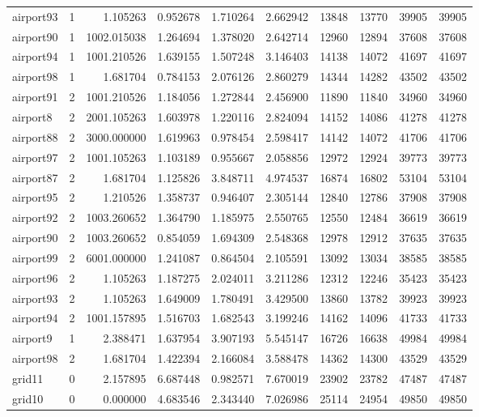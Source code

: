 \begin{longtable}{|l|r|r|r|r|r|r|r|r|r|}
airport93 & 1 & 1.105263 & 0.952678 & 1.710264 & 2.662942 & 13848 & 13770 & 39905 & 39905 \\
airport90 & 1 & 1002.015038 & 1.264694 & 1.378020 & 2.642714 & 12960 & 12894 & 37608 & 37608 \\
airport94 & 1 & 1001.210526 & 1.639155 & 1.507248 & 3.146403 & 14138 & 14072 & 41697 & 41697 \\
airport98 & 1 & 1.681704 & 0.784153 & 2.076126 & 2.860279 & 14344 & 14282 & 43502 & 43502 \\
airport91 & 2 & 1001.210526 & 1.184056 & 1.272844 & 2.456900 & 11890 & 11840 & 34960 & 34960 \\
airport8 & 2 & 2001.105263 & 1.603978 & 1.220116 & 2.824094 & 14152 & 14086 & 41278 & 41278 \\
airport88 & 2 & 3000.000000 & 1.619963 & 0.978454 & 2.598417 & 14142 & 14072 & 41706 & 41706 \\
airport97 & 2 & 1001.105263 & 1.103189 & 0.955667 & 2.058856 & 12972 & 12924 & 39773 & 39773 \\
airport87 & 2 & 1.681704 & 1.125826 & 3.848711 & 4.974537 & 16874 & 16802 & 53104 & 53104 \\
airport95 & 2 & 1.210526 & 1.358737 & 0.946407 & 2.305144 & 12840 & 12786 & 37908 & 37908 \\
airport92 & 2 & 1003.260652 & 1.364790 & 1.185975 & 2.550765 & 12550 & 12484 & 36619 & 36619 \\
airport90 & 2 & 1003.260652 & 0.854059 & 1.694309 & 2.548368 & 12978 & 12912 & 37635 & 37635 \\
airport99 & 2 & 6001.000000 & 1.241087 & 0.864504 & 2.105591 & 13092 & 13034 & 38585 & 38585 \\
airport96 & 2 & 1.105263 & 1.187275 & 2.024011 & 3.211286 & 12312 & 12246 & 35423 & 35423 \\
airport93 & 2 & 1.105263 & 1.649009 & 1.780491 & 3.429500 & 13860 & 13782 & 39923 & 39923 \\
airport94 & 2 & 1001.157895 & 1.516703 & 1.682543 & 3.199246 & 14162 & 14096 & 41733 & 41733 \\
airport9 & 1 & 2.388471 & 1.637954 & 3.907193 & 5.545147 & 16726 & 16638 & 49984 & 49984 \\
airport98 & 2 & 1.681704 & 1.422394 & 2.166084 & 3.588478 & 14362 & 14300 & 43529 & 43529 \\
grid11 & 0 & 2.157895 & 6.687448 & 0.982571 & 7.670019 & 23902 & 23782 & 47487 & 47487 \\
grid10 & 0 & 0.000000 & 4.683546 & 2.343440 & 7.026986 & 25114 & 24954 & 49850 & 49850 \\

\end{longtable}
